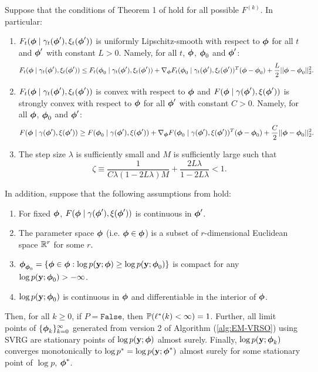 \begin{theorem}

    Suppose that the conditions of Theorem 1 of \citet{Johnson:2013} hold for all possible $F^{(k)}$. In particular:
    
    \begin{enumerate}
        \item $F_t(\boldsymbol{\phi} \mid \gamma_t(\boldsymbol{\phi}'), \xi_t(\boldsymbol{\phi}'))$ is uniformly Lipschitz-smooth with respect to $\boldsymbol{\phi}$ for all $t$ and $\boldsymbol{\phi}'$ with constant $L > 0$. Namely, for all $t$, $\boldsymbol{\phi}$, $\boldsymbol{\phi}_0$ and $\boldsymbol{\phi}'$:
        $$F_t(\boldsymbol{\phi} \mid \gamma_t(\boldsymbol{\phi}'), \xi_t(\boldsymbol{\phi}')) \leq F_t(\boldsymbol{\phi}_0 \mid \gamma_t(\boldsymbol{\phi}'), \xi_t(\boldsymbol{\phi}')) + \nabla_{\boldsymbol{\phi}} F_t(\boldsymbol{\phi}_0 \mid \gamma_t(\boldsymbol{\phi}'), \xi_t(\boldsymbol{\phi}'))^T(\boldsymbol{\phi} - \boldsymbol{\phi}_0) + \frac{L}{2} || \boldsymbol{\phi} - \boldsymbol{\phi}_0 ||_2^2.$$ 
        \item $F_t(\boldsymbol{\phi} \mid \gamma_t(\boldsymbol{\phi}'), \xi_t(\boldsymbol{\phi}'))$ is convex with respect to $\boldsymbol{\phi}$ and $F(\boldsymbol{\phi} \mid \gamma(\boldsymbol{\phi}'), \xi(\boldsymbol{\phi}'))$ is strongly convex with respect to $\boldsymbol{\phi}$ for all $\boldsymbol{\phi}'$ with constant $C > 0$. Namely, for all $\boldsymbol{\phi}$, $\boldsymbol{\phi}_0$ and $\boldsymbol{\phi}'$:
        $$F(\boldsymbol{\phi} \mid \gamma(\boldsymbol{\phi}'), \xi(\boldsymbol{\phi}')) \geq F(\boldsymbol{\phi}_0 \mid \gamma(\boldsymbol{\phi}'), \xi(\boldsymbol{\phi}')) + \nabla_{\boldsymbol{\phi}} F(\boldsymbol{\phi}_0 \mid \gamma(\boldsymbol{\phi}'), \xi(\boldsymbol{\phi}'))^T(\boldsymbol{\phi}-\boldsymbol{\phi}_0) + \frac{C}{2} ||\boldsymbol{\phi} - \boldsymbol{\phi}_0||_2^2.$$ 
        \item The step size $\lambda$ is sufficiently small and $M$ is sufficiently large such that 
        $$\zeta \equiv \frac{1}{C \lambda(1-2L\lambda)M} + \frac{2L\lambda}{1-2L\lambda} < 1.$$
    \end{enumerate}

    In addition, suppose that the following assumptions from \citet{Wu:1983} hold:

    \begin{enumerate}
        \item For fixed $\boldsymbol{\phi}$, $F(\boldsymbol{\phi} \mid \gamma(\boldsymbol{\phi}'), \xi(\boldsymbol{\phi}'))$ is continuous in $\boldsymbol{\phi}'$.
        \item The parameter space $\boldsymbol{\phi}$ (i.e. $\boldsymbol{\phi} \in \boldsymbol{\phi}$) is a subset of $r$-dimensional Euclidean space $\mathbb{R}^r$ for some $r$.
        \item $\boldsymbol{\phi}_{\boldsymbol{\phi}_0} = \{\boldsymbol{\phi} \in \boldsymbol{\phi}: \log p(\mathbf{y};\boldsymbol{\phi}) \geq \log p(\mathbf{y};\boldsymbol{\phi}_0)\}$ is compact for any $\log p(\mathbf{y};\boldsymbol{\phi}_0) > -\infty$.
        \item $\log p(\mathbf{y};\boldsymbol{\phi}_0)$ is continuous in $\boldsymbol{\phi}$ and differentiable in the interior of $\boldsymbol{\phi}$.
    \end{enumerate}
    
    Then, for all $k \geq 0$, if $P = \texttt{False}$, then $\mathbb{P}(\ell^*(k) < \infty) = 1$. Further, all limit points of $\{\boldsymbol{\phi}_{k}\}_{k=0}^\infty$ generated from version 2 of Algorithm (\ref{alg:EM-VRSO}) using SVRG are stationary points of $\log p(\mathbf{y};\boldsymbol{\phi})$ almost surely. Finally, $\log p(\mathbf{y};\boldsymbol{\phi}_{k})$ converges monotonically to $\log p^* = \log p(\mathbf{y};\boldsymbol{\phi}^*)$ almost surely for some stationary point of $\log p$, $\boldsymbol{\phi}^*$.
\end{theorem}
%

